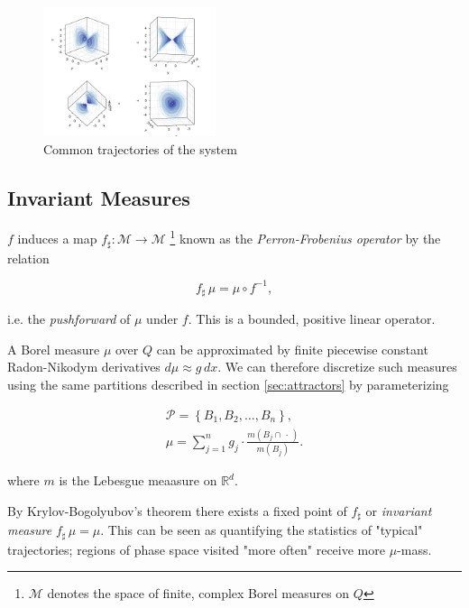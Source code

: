 \documentclass{juliacon}
\newcommand{\R}{{\mathbb R}}
\newcommand{\cP}{\mathcal{P}}
\newcommand{\cM}{\mathcal{M}}
\begin{document}
\begin{figure}
    \centering
    \includegraphics[width=0.45\textwidth]{trajectories.png}
    \caption{Common trajectories of the system}
    \label{fig:trajectories}
\end{figure}

\subsection{Invariant Measures}

$f$ induces a map $f_\sharp : \cM \to \cM$ \footnote{$\cM$ denotes the space of finite, complex Borel measures on $Q$} known as the \emph{Perron-Frobenius operator} by the relation 

\begin{equation}
    f_\sharp\, \mu = \mu \circ f^{-1},
\end{equation}

i.e. the \emph{pushforward} of $\mu$ under $f$. This is a bounded, positive linear operator. 

A Borel measure $\mu$ over $Q$ can be approximated by finite piecewise constant Radon-Nikodym derivatives $d\mu \approx g\, dx$. We can therefore discretize such measures using the same partitions described in section \ref{sec:attractors} by parameterizing 

\begin{equation}
    \begin{split}
        \cP = \left\{ B_1, B_2, \ldots, B_n \right\}, \\
        \mu = \sum_{j=1}^{n} g_j \cdot \frac{m(B_j \cap \,\cdot\,)}{m(B_j)}.
    \end{split}
\end{equation}

where $m$ is the Lebesgue meaasure on $\R^d$. 

By Krylov-Bogolyubov's theorem \cite{invariantmeasureexistence} there exists a fixed point of $f_\sharp$ or \emph{invariant measure} $f_\sharp\, \mu = \mu$. This can be seen as quantifying the statistics of "typical" trajectories; regions of phase space visited "more often" receive more $\mu$-mass. 
\end{document}
